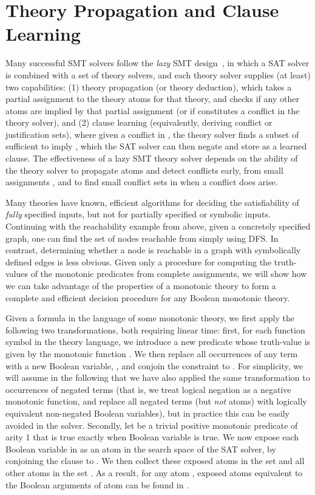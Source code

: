 \documentclass[runningheads]{llncs}
\begin{document}
\section{Theory Propagation and Clause Learning\label{sec:propagation}}



Many successful SMT solvers follow the \textit{lazy} SMT
design~\cite{sebastiani2007lazy,de2008z3}, in which a SAT solver is
combined with a set of theory solvers, and each theory solver supplies
(at least) two capabilities:  (1) theory propagation (or
theory deduction), which takes a partial assignment  to the theory
atoms for that theory, and checks if any other atoms are implied by
that partial assignment (or if  constitutes a conflict in the theory
solver), and (2) clause learning (equivalently, deriving conflict
or justification sets), where given a conflict  in , the theory
solver finds a subset of  sufficient to imply , which the SAT
solver can then negate and store as a learned clause. The effectiveness
of a lazy SMT theory solver depends on the ability of the theory solver
to propagate atoms and detect conflicts early, from small assignments , and to
find small conflict sets in  when a conflict does arise.

Many theories have known, efficient
algorithms for deciding the satisfiability of \textit{fully} specified inputs, but not for partially
specified or symbolic inputs. Continuing with the reachability example from above, given a concretely specified graph, one can find the set of nodes reachable from  simply using DFS. In contrast, determining whether a node is reachable in a graph with symbolically defined edges is less obvious. Given only a procedure for computing the truth-values of the monotonic predicates
 from complete assignments, we will show how we can take advantage of the properties of a monotonic theory
to form a complete and efficient decision procedure for any Boolean monotonic theory. 

Given a formula  in the language of some monotonic theory, we first apply the following two transformations, both requiring
linear time: first, for each function symbol  in the theory language, we introduce a new predicate  whose truth-value is given by the monotonic function .
We then replace all occurrences of any term  with a new Boolean variable, , and conjoin the constraint  to . For simplicity, we will assume in the following that we have also applied the same transformation to occurrences of negated terms (that is, we treat logical negation as a negative monotonic function, and replace all negated terms (but \textit{not} atoms) with logically equivalent non-negated Boolean variables), but in practice this can be easily avoided in the solver.
Secondly, let  be a trivial positive monotonic predicate of arity 1 that is true exactly when Boolean variable  is true. 
We now expose each Boolean variable  in  as an atom in the search space of the SAT solver, by conjoining the clause  to . We then collect these exposed atoms in the set  and all other atoms in the set . As a result, for any atom , exposed atoms equivalent to the Boolean arguments of atom  can be found in .
\end{document}
